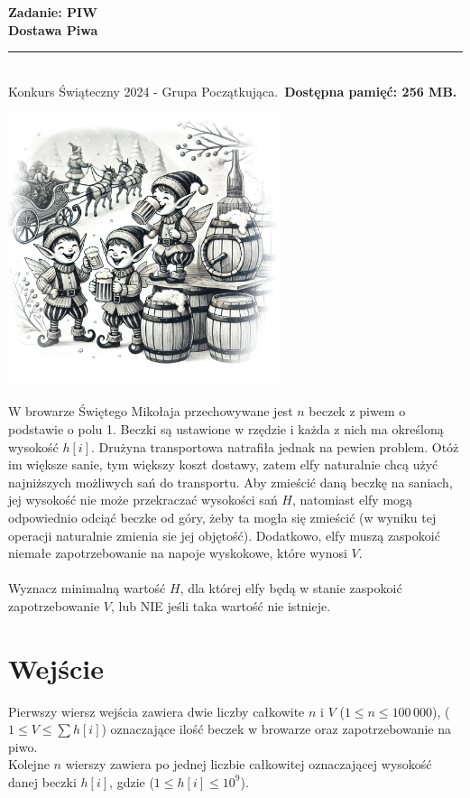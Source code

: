 \documentclass[a4paper,11pt]{article}
\newcommand{\tasktitle}{Dostawa Piwa}
\newcommand{\taskshort}{PIW}
\newcommand{\contestinfo}{Konkurs Świąteczny 2024 - Grupa Początkująca.}
\newcommand{\memorylimit}{256 MB}
\begin{document}
\noindent\textbf{\LARGE Zadanie: \taskshort} \\
\textbf{\Large \tasktitle} \\
\rule{\textwidth}{0.4pt} \\
\small \contestinfo \
\textbf{Dostępna pamięć: \memorylimit.}

\begin{center}
\includegraphics[width=0.6\textwidth]{elfy_zadanie_piwo.jpg} %
\end{center}

\noindent W browarze Świętego Mikołaja przechowywane jest $n$ beczek z piwem o podstawie o polu 1. Beczki są ustawione w rzędzie i każda z nich ma określoną wysokość $h[i]$. Drużyna transportowa natrafiła jednak na pewien problem. Otóż im większe sanie, tym większy koszt dostawy, zatem elfy naturalnie chcą użyć najniższych możliwych sań do transportu. Aby zmieścić daną beczkę na saniach, jej wysokość nie może przekraczać wysokości sań $H$, natomiast elfy mogą odpowiednio odciąć beczke od góry, żeby ta mogła się zmieścić (w wyniku tej operacji naturalnie zmienia sie jej objętość). Dodatkowo, elfy muszą zaspokoić niemałe zapotrzebowanie na napoje wyskokowe, które wynosi $V$.\\\\Wyznacz minimalną wartość $H$, dla której elfy będą w stanie zaspokoić zapotrzebowanie $V$, lub NIE jeśli taka wartość nie istnieje.


\section*{Wejście}
Pierwszy wiersz wejścia zawiera dwie liczby całkowite $n$ i $V$ ($1 \leq n \leq 100\,000$), ($1 \leq V \leq \sum h[i]$) oznaczające ilość beczek w browarze oraz zapotrzebowanie na piwo.\\Kolejne $n$ wierszy zawiera po jednej liczbie całkowitej oznaczającej wysokość danej beczki $h[i]$, gdzie ($1 \leq h[i] \leq 10^9$).
\end{document}
